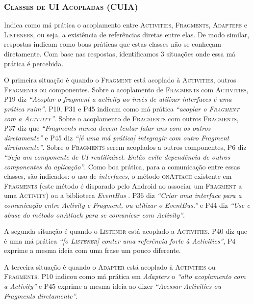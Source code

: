 \subsubsection{\textsc{Classes de UI Acopladas (CUIA)}}
Indica como má prática o acoplamento entre \textsc{Activities}, \textsc{Fragments}, \textsc{Adapters} e \textsc{Listeners}, ou seja, a existência de referências diretas entre elas. De modo similar, respostas indicam como boas práticas que estas classes não se conheçam diretamente. Com base nas respostas, identificamos 3 situações onde essa má prática é percebida.

O primeira situação é quando o \textsc{Fragment} está acoplado à \textsc{Activities}, outros \textsc{Fragments} ou componentes. Sobre o acoplamento de \textsc{Fragments} com \textsc{Activities}, P19 diz \textit{``Acoplar o fragment a activity ao invés de utilizar interfaces é uma prática ruim''}. P10, P31 e P45 indicam como má prática \textit{``acoplar o \textsc{Fragment} com a \textsc{Activity}''}. Sobre o acoplamento de \textsc{Fragments} com outros \textsc{Fragments}, P37 diz que \textit{``Fragments nunca devem tentar falar uns com os outros diretamente''} e P45 diz \textit{``[é uma má prática] integragir com outro Fragment diretamente''}. Sobre o \textsc{Fragments} serem acoplados a outros componentes, P6 diz \textit{``Seja um componente de UI reutilizável. Então evite dependência de outros componentes da aplicação''}. Como boa prática, para a comunicação entre essas classes, são indicados: o uso de \textit{interfaces}, o método \textsc{onAttach} existente em \textsc{Fragments} (este método é disparado pelo Android ao associar um \textsc{Fragment} a uma \textsc{Activity}) ou a biblioteca \textit{EventBus} \cite{EventBusAndroid}. P36 diz \textit{``Criar uma interface para a comunicação entre Activity e Fragment, ou utilizar o EventBus.''} e P44 diz \textit{``Use e abuse do método onAttach para se comunicar com Activity''}. 

A segunda situação é quando o \textsc{Listener} está acoplado a \textsc{Activities}. P40 diz que é uma má prática \textit{``[o \textsc{Listener}] conter uma referência forte à Activities''}, P4 exprime a mesma ideia com uma frase um pouco diferente. 

A terceira situação é quando o \textsc{Adapter} está acoplado à \textsc{Activities} ou \textsc{Fragments}. P10 indicou como má prática em \textit{Adapters} o \textit{``alto acoplamento com a Activity''} e P45 exprime a mesma ideia ao dizer \textit{``Acessar Activities ou Fragments diretamente''}. 

